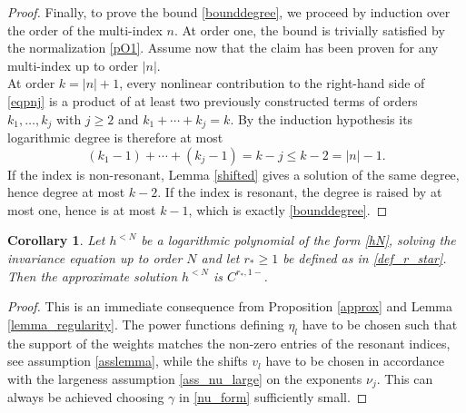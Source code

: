 \documentclass{amsart}
\theoremstyle{plain}
\newtheorem{corollary}[theorem]{Corollary}
\theoremstyle{definition}
\newtheorem{remark}[theorem]{Remark}
\begin{document}
\begin{proof}
Finally, to prove the bound \eqref{bounddegree}, we proceed by induction over the order of the multi-index $n$. At order one, the bound is trivially satisfied by the normalization \eqref{pO1}. Assume now that the claim has been proven for any multi-index up to order $|n|$.\\
At order $k=|n|+1$, every nonlinear contribution to the right-hand side of \eqref{eqpnj} is a product of at least two previously constructed terms of orders $k_1,\ldots,k_j$ with $j\geq2$ and $k_1+\cdots+k_j=k$. By the induction hypothesis its logarithmic degree is therefore at most
\begin{equation}
(k_1-1)+\cdots+(k_j-1)=k-j\leq k-2=|n|-1.
\end{equation}
If the index is non-resonant, Lemma \ref{shifted} gives a solution of the same degree, hence degree at most $k-2$. If the index is resonant, the degree is raised by at most one, hence is at most $k-1$, which is exactly \eqref{bounddegree}.
\end{proof}


\begin{corollary}
Let $h^{<N}$ be a logarithmic polynomial of the form \eqref{hN}, solving the invariance equation up to order $N$ and let $r_*\geq 1$ be defined as in \eqref{def_r_star}. Then the approximate solution $h^{<N}$ is $C^{r_*,1-}$.
\end{corollary}

\begin{proof}
   This is an immediate consequence from Proposition \ref{approx} and Lemma \ref{lemma_regularity}. The power functions defining $\eta_l$ have to be chosen such that the support of the weights matches the non-zero entries of the resonant indices, see assumption \eqref{asslemma}, while the shifts $v_l$ have to be chosen in accordance with the largeness assumption \eqref{ass_nu_large} on the exponents $\nu_j$. This can always be achieved choosing $\gamma$ in \eqref{nu_form} sufficiently small. 
\end{proof}

\end{document}
